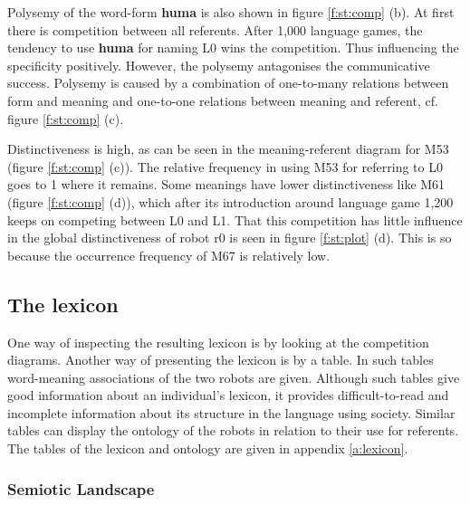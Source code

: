 Polysemy of the word-form {\bf huma} is also shown in figure \ref{f:st:comp} (b). At first there is competition between all referents. After 1,000 language games, the tendency to use {\bf huma} for naming L0 wins the competition. Thus influencing the specificity positively. However, the polysemy antagonises the communicative success. Polysemy is caused by a combination of one-to-many relations between form and meaning and one-to-one relations between meaning and referent, cf. figure \ref{f:st:comp} (c).

Distinctiveness is high, as can be seen in the meaning-referent diagram for M53 (figure \ref{f:st:comp} (c)). The relative frequency in using M53 for referring to L0 goes to 1 where it remains. Some meanings have lower distinctiveness like M61 (figure \ref{f:st:comp} (d)), which after its introduction around language game 1,200 keeps on competing between L0 and L1. That this competition has little influence in the global distinctiveness of robot r0 is seen in figure \ref{f:st:plot} (d). This is so because the occurrence frequency of M67 is relatively low.

\subsection{The lexicon}

One way of inspecting the resulting lexicon is by looking at the competition diagrams. Another way of presenting the lexicon is by a table. In such tables word-meaning associations of the two robots are given. Although such tables give good information about an individual's lexicon, it provides difficult-to-read and incomplete information about its structure in the language using society. Similar tables can display the ontology of the robots in relation to their use for referents. The tables of the lexicon and ontology are given in appendix \ref{a:lexicon}.

\subsubsection{Semiotic Landscape}

